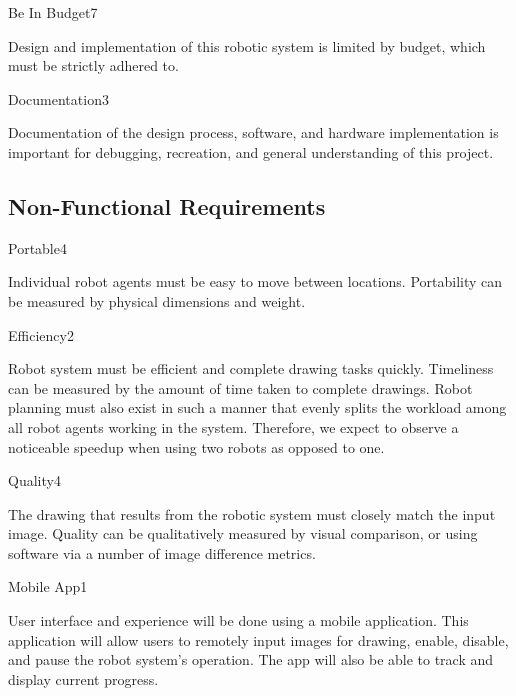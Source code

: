 \begin{functional_requirement}{Be In Budget}{7}
\item Design and implementation of this robotic system is limited by budget, which must be strictly adhered to.
\end{functional_requirement}

\begin{functional_requirement}{Documentation}{3}
\item Documentation of the design process, software, and hardware implementation is important for debugging, recreation, and general understanding of this project.
\end{functional_requirement}


\subsection{Non-Functional Requirements}
\label{sec:nonfunctional_requirements}

\begin{nonfunctional_requirement}{Portable}{4}
\item Individual robot agents must be easy to move between locations. Portability can be measured by physical dimensions and weight.
\end{nonfunctional_requirement}

\begin{nonfunctional_requirement}{Efficiency}{2}
\item Robot system must be efficient and complete drawing tasks quickly. Timeliness can be measured by the amount of time taken to complete drawings. Robot planning must also exist in such a manner that evenly splits the workload among all robot agents working in the system. Therefore, we expect to observe a noticeable speedup when using two robots as opposed to one. 
\end{nonfunctional_requirement}

\begin{nonfunctional_requirement}{Quality}{4}
\item The drawing that results from the robotic system must closely match the input image. Quality can be qualitatively measured by visual comparison, or using software via a number of image difference metrics.
\end{nonfunctional_requirement}

\begin{nonfunctional_requirement}{Mobile App}{1}
\item User interface and experience will be done using a mobile application. This application will allow users to remotely input images for drawing, enable, disable, and pause the robot system's operation. The app will also be able to track and display current progress.
\end{nonfunctional_requirement}

